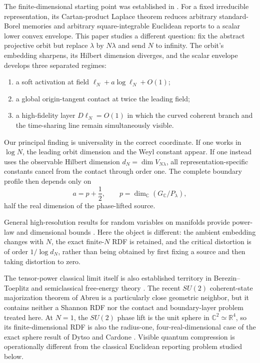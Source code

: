 \documentclass[11pt]{article}
\newcommand{\R}{\mathbb R}
\newcommand{\C}{\mathbb C}
\begin{document}
The finite-dimensional starting point was established in
\cite{Eriksson2026Coherent}.  For a fixed irreducible representation, its
Cartan-product Laplace theorem reduces arbitrary standard-Borel memories and
arbitrary square-integrable Euclidean reports to a scalar lower convex
envelope.  This paper studies a different question: fix the abstract
projective orbit but replace $\lambda$ by $N\lambda$ and send $N$ to
infinity.  The orbit's embedding sharpens, its Hilbert dimension diverges,
and the scalar envelope develops three separated regimes:
\begin{enumerate}[leftmargin=2em]
 \item a soft activation at field
 $\ell_N+a\log\ell_N+O(1)$;
 \item a global origin-tangent contact at twice the leading field;
 \item a high-fidelity layer $D\ell_N=O(1)$ in which the curved coherent
 branch and the time-sharing line remain simultaneously visible.
\end{enumerate}

Our principal finding is universality in the correct coordinate.  If one
works in $\log N$, the leading orbit dimension and the Weyl constant appear.
If one instead uses the observable Hilbert dimension
$d_N=\dim V_{N\lambda}$, all representation-specific constants cancel from
the contact through order one.  The complete boundary profile then depends
only on
\[
 a=p+\frac12,
 \qquad p=\dim_{\C}(G_{\C}/P_\lambda),
\]
half the real dimension of the phase-lifted source.

General high-resolution results for random variables on manifolds provide
power-law and dimensional bounds
\cite{KawabataDembo1994,LinderZamir1999,RieglerKolianderBolcskei2023}.  Here
the object is different: the ambient embedding changes with $N$, the exact
finite-$N$ RDF is retained, and the critical distortion is of order
$1/\log d_N$, rather than being obtained by first fixing a source and then
taking distortion to zero.

The tensor-power classical limit itself is also established territory in
Berezin--Toeplitz and semiclassical free-energy theory
\cite{Schlichenmaier2010,AmmariEtAl2025}.  The recent $SU(2)$ coherent-state
majorization theorem of Abreu \cite{Abreu2026} is a particularly close
geometric neighbor, but it contains neither a Shannon RDF nor the contact and
boundary-layer problem treated here.  At $N=1$, the $SU(2)$ phase lift is the
unit sphere in $\C^2\simeq\R^4$, so its finite-dimensional RDF is also the
radius-one, four-real-dimensional case of the exact sphere result of Dytso
and Cardone \cite{DytsoCardone2024}.  Visible quantum compression
\cite{HaydenJozsaWinter2002} is operationally different from the classical
Euclidean reporting problem studied below.
\end{document}

